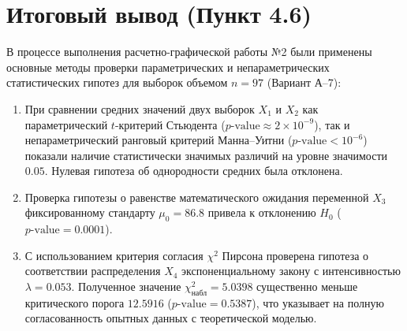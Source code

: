 \documentclass[12pt,a4paper]{article}
\begin{document}
\section{Итоговый вывод (Пункт 4.6)}
В процессе выполнения расчетно-графической работы №2 были применены основные методы проверки параметрических и непараметрических статистических гипотез для выборок объемом $n = 97$ (Вариант А--7):
\begin{enumerate}
    \item При сравнении средних значений двух выборок $X_1$ и $X_2$ как параметрический $t$-критерий Стьюдента ($p\text{-value} \approx 2 \times 10^{-9}$), так и непараметрический ранговый критерий Манна--Уитни ($p\text{-value} < 10^{-6}$) показали наличие статистически значимых различий на уровне значимости $0.05$. Нулевая гипотеза об однородности средних была отклонена.
    \item Проверка гипотезы о равенстве математического ожидания переменной $X_3$ фиксированному стандарту $\mu_0 = 86.8$ привела к отклонению $H_0$ ($p\text{-value} = 0.0001$).
    \item С использованием критерия согласия $\chi^2$ Пирсона проверена гипотеза о соответствии распределения $X_4$ экспоненциальному закону с интенсивностью $\lambda = 0.053$. Полученное значение $\chi^2_{\text{набл}} = 5.0398$ существенно меньше критического порога $12.5916$ ($p\text{-value} = 0.5387$), что указывает на полную согласованность опытных данных с теоретической моделью.
\end{enumerate}
\end{document}
